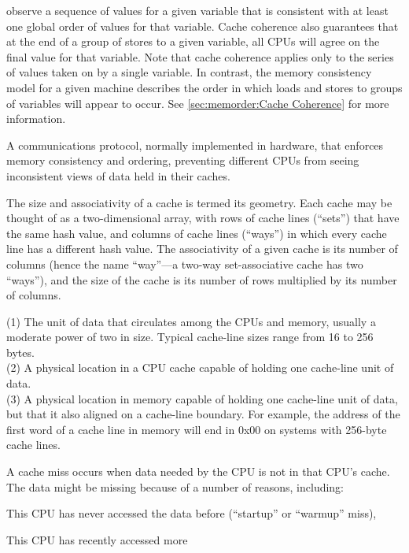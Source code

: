 \begin{description}
	observe a sequence of values for a given variable that is
	consistent with at least one global order of values for
	that variable.
	Cache coherence also guarantees that at the end of a group
	of stores to a given variable, all CPUs will agree
	on the final value for that variable.
	Note that cache coherence applies only to the series of values
	taken on by a single variable.
	In contrast, the memory consistency model for a given machine
	describes the order in which loads and stores to groups of
	variables will appear to occur.
	See \cref{sec:memorder:Cache Coherence}
	for more information.
\item[\IXG{Cache-Coherence Protocol}:]
	A communications protocol, normally implemented in hardware,
	that enforces memory consistency and ordering, preventing
	different CPUs from seeing inconsistent views of data held
	in their caches.
\item[\IXG{Cache Geometry}:]
	The size and associativity of a cache is termed its geometry.
	Each cache may be thought of as a two-dimensional array,
	with rows of cache lines (``sets'') that have the same hash
	value, and columns of cache lines (``ways'') in which every
	cache line has a different hash value.
	The associativity of a given cache is its number of
	columns (hence the name ``way''---a two-way set-associative
	cache has two ``ways''), and the size of the cache is its
	number of rows multiplied by its number of columns.
\item[\IXG{Cache Line}:]
	(1) The unit of data that circulates among the CPUs and memory,
	usually a moderate power of two in size.
	Typical cache-line sizes range from 16 to 256 bytes. \\
	(2) A physical location in a CPU cache capable of holding
	one cache-line unit of data. \\
	(3) A physical location in memory capable of holding one
	cache-line unit of data, but that it also aligned
	on a cache-line boundary.
	For example, the address of the first word of a cache line
	in memory will end in 0x00 on systems with 256-byte cache lines.
\item[\IXG{Cache Miss}:]
	A cache miss occurs when data needed by the CPU is not in
	that CPU's cache.
	The data might be missing because of a number of reasons,
	including:
	\begin{enumerate*}[(1)]
	\item This CPU has never accessed the data before
	(``startup'' or ``warmup'' miss),
	\item This CPU has recently accessed more

\end{enumerate*}
\end{description}
